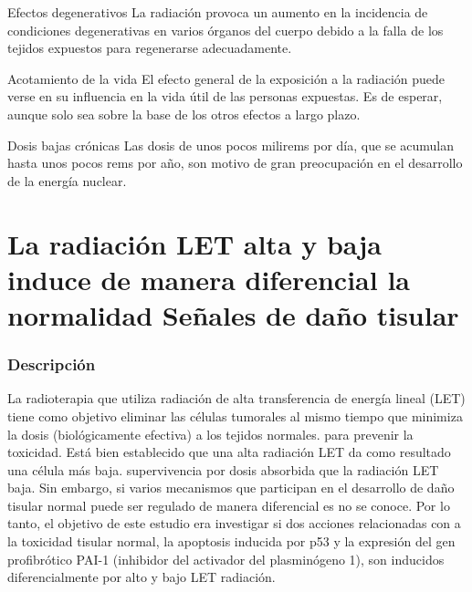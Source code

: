 \documentclass{beamer}
\begin{document}
\begin{frame}
	
	\begin{block}{Efectos degenerativos}
		La radiación provoca un aumento en la incidencia de condiciones degenerativas en varios órganos del cuerpo debido a la falla de los tejidos expuestos para regenerarse adecuadamente.\\
	\end{block}

    \begin{block}{Acotamiento de la vida}
    	El efecto general de la exposición a la radiación puede verse en su influencia en la vida útil de las personas expuestas. Es de esperar, aunque solo sea sobre la base de los otros efectos a largo plazo.\\
    \end{block}

   \begin{block}{Dosis bajas crónicas}
	Las dosis de unos pocos milirems por día, que se acumulan hasta unos pocos rems por año, son motivo de gran preocupación en el desarrollo de la energía nuclear.\\
  \end{block}

\end{frame}


\section{La radiación LET alta y baja induce de manera diferencial la normalidad
	Señales de daño tisular}



\begin{frame}
	\frametitle{Descripción}
	 La radioterapia que utiliza radiación de alta transferencia de energía lineal (LET) tiene como objetivo eliminar las células tumorales al mismo tiempo que minimiza la dosis (biológicamente efectiva) a los tejidos normales.
	para prevenir la toxicidad. Está bien establecido que una alta radiación LET da como resultado una célula más baja.
	supervivencia por dosis absorbida que la radiación LET baja. Sin embargo, si varios mecanismos
	que participan en el desarrollo de daño tisular normal puede ser regulado de manera diferencial es
	no se conoce. Por lo tanto, el objetivo de este estudio era investigar si dos acciones relacionadas con
	a la toxicidad tisular normal, la apoptosis inducida por p53 y la expresión del gen profibrótico
	PAI-1 (inhibidor del activador del plasminógeno 1), son inducidos diferencialmente por alto y bajo LET
	radiación.
\end{frame}
\end{document}
